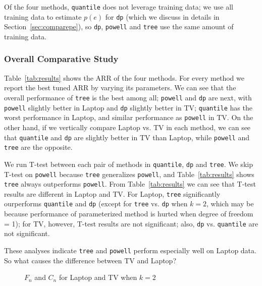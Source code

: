 Of the four methods, \texttt{quantile} does not leverage training data; we use all training data to estimate $p(e)$ for \texttt{dp} (which we discuss in details in Section~\ref{sec:comparepe}), so \texttt{dp}, \texttt{powell} and \texttt{tree} use the same amount of training data.

\subsubsection{Overall Comparative Study}
Table~\ref{tab:results} shows the ARR of the four methods. For every method we report the best tuned ARR by varying its parameters. We can see that the overall performance of \texttt{tree} is the best among all; \texttt{powell} and \texttt{dp} are next, with \texttt{powell} slightly better in Laptop and \texttt{dp} slightly better in TV; \texttt{quantile} has the worst performance in Laptop, and similar performance as \texttt{powell} in TV. On the other hand, if we vertically compare Laptop vs. TV in each method, we can see that \texttt{quantile} and \texttt{dp} are slightly better in TV than Laptop, while \texttt{powell} and \texttt{tree} are the opposite. 

We run T-test between each pair of methods in \texttt{quantile}, \texttt{dp} and \texttt{tree}. We skip T-test on \texttt{powell} because \texttt{tree} generalizes \texttt{powell}, and Table~\ref{tab:results} shows \texttt{tree} always outperforms \texttt{powell}. From Table~\ref{tab:results} we can see that T-test results are different in Laptop and TV. For Laptop, \texttt{tree} significantly ourperforms \texttt{quantile} and \texttt{dp} (except for \texttt{tree} vs. \texttt{dp} when $k=2$, which may be because performance of parameterized method is hurted when degree of freedom = 1); for TV, however, T-test results are not significant; also, \texttt{dp} vs. \texttt{quantile} are not significant.

These analyses indicate \texttt{tree} and \texttt{powell} perform especially well on Laptop data. So what causes the difference between TV and Laptop?

\begin{figure}[h]
\centering
\vspace{-0.2in}
\subfloat{

}
\subfloat{

}
\vspace{-0.1in}
\caption{$F_n$ and $C_n$ for Laptop and TV when $k=2$\label{fig:laptoptv}}
\end{figure}

